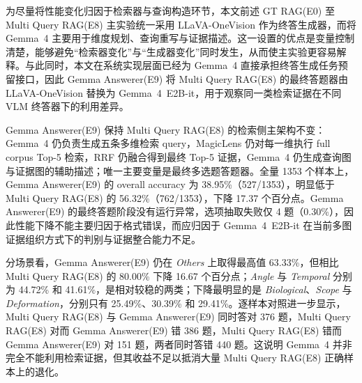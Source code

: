 为尽量将性能变化归因于检索器与查询构造环节，本文前述 GT RAG(E0) 至 Multi Query RAG(E8) 主实验统一采用 LLaVA-OneVision 作为终答生成器，而将 Gemma~4 主要用于维度规划、查询重写与证据描述。这一设置的优点是变量控制清楚，能够避免“检索器变化”与“生成器变化”同时发生，从而使主实验更容易解释。与此同时，本文在系统实现层面已经为 Gemma~4 直接承担终答生成任务预留接口，因此 Gemma Answerer(E9) 将 Multi Query RAG(E8) 的最终答题器由 LLaVA-OneVision 替换为 Gemma~4~E2B-it，用于观察同一类检索证据在不同 VLM 终答器下的利用差异。

Gemma Answerer(E9) 保持 Multi Query RAG(E8) 的检索侧主架构不变：Gemma~4 仍负责生成五条多维检索 query，MagicLens 仍对每一维执行 full corpus Top-5 检索，RRF 仍融合得到最终 Top-5 证据，Gemma~4 仍生成查询图与证据图的辅助描述；唯一主要变量是最终多选题答题器。全量 1353 个样本上，Gemma Answerer(E9) 的 overall accuracy 为 38.95\%（527/1353），明显低于 Multi Query RAG(E8) 的 56.32\%（762/1353），下降 17.37 个百分点。Gemma Answerer(E9) 的最终答题阶段没有运行异常，选项抽取失败仅 4 题（0.30\%），因此性能下降不能主要归因于格式错误，而应归因于 Gemma~4~E2B-it 在当前多图证据组织方式下的判别与证据整合能力不足。

分场景看，Gemma Answerer(E9) 仍在 \textit{Others} 上取得最高值 63.33\%，但相比 Multi Query RAG(E8) 的 80.00\% 下降 16.67 个百分点；\textit{Angle} 与 \textit{Temporal} 分别为 44.72\% 和 41.61\%，是相对较稳的两类；下降最明显的是 \textit{Biological}、\textit{Scope} 与 \textit{Deformation}，分别只有 25.49\%、30.39\% 和 29.41\%。逐样本对照进一步显示，Multi Query RAG(E8) 与 Gemma Answerer(E9) 同时答对 376 题，Multi Query RAG(E8) 对而 Gemma Answerer(E9) 错 386 题，Multi Query RAG(E8) 错而 Gemma Answerer(E9) 对 151 题，两者同时答错 440 题。这说明 Gemma~4 并非完全不能利用检索证据，但其收益不足以抵消大量 Multi Query RAG(E8) 正确样本上的退化。

\begin{table}[!htb]
\centering
\scriptsize
\caption{LLaVA 与 Gemma~4 终答生成器对比结果。}
\label{tab:generator_compare}
\end{table}

